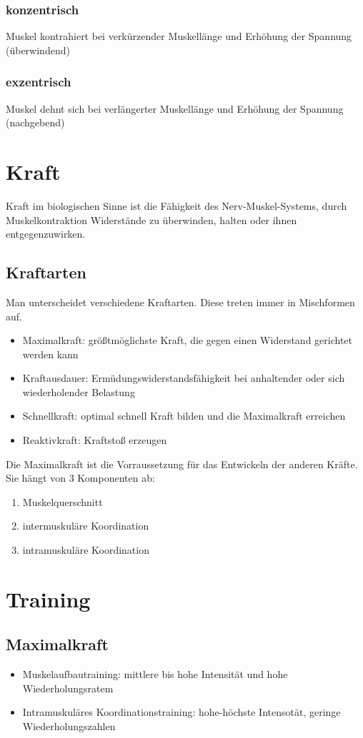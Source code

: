 \documentclass{article}
\begin{document}
\subsubsection*{konzentrisch}
Muskel kontrahiert bei verkürzender Muskellänge und Erhöhung der Spannung (überwindend)
\subsubsection*{exzentrisch}
Muskel dehnt sich bei verlängerter Muskellänge und Erhöhung der Spannung (nachgebend)

\section*{Kraft}
Kraft im biologischen Sinne ist die Fähigkeit des Nerv-Muskel-Systems, durch Muskelkontraktion Widerstände
zu überwinden, halten oder ihnen entgegenzuwirken.
\subsection*{Kraftarten}
Man unterscheidet verschiedene Kraftarten. Diese treten immer in Mischformen auf.
\begin{itemize}
    \item Maximalkraft: größtmöglichste Kraft, die gegen einen Widerstand gerichtet werden kann
    \item Kraftausdauer: Ermüdungswiderstandsfähigkeit bei anhaltender oder sich wiederholender Belastung
    \item Schnellkraft: optimal schnell Kraft bilden und die Maximalkraft erreichen
    \item Reaktivkraft: Kraftstoß erzeugen
\end{itemize}

Die Maximalkraft ist die Vorraussetzung für das Entwickeln der anderen Kräfte. Sie hängt von 3 Komponenten ab:
\begin{enumerate}
    \item Muskelquerschnitt
    \item intermuskuläre Koordination
    \item intramuskuläre Koordination
\end{enumerate}
\section*{Training}
\subsection*{Maximalkraft}
\begin{itemize}
    \item Muskelaufbautraining: mittlere bis hohe Intensität und hohe Wiederholungsratem
    \item Intramuskuläres Koordinationstraining: hohe-höchste Intensotät, geringe Wiederholungszahlen
\end{itemize}
\end{document}
